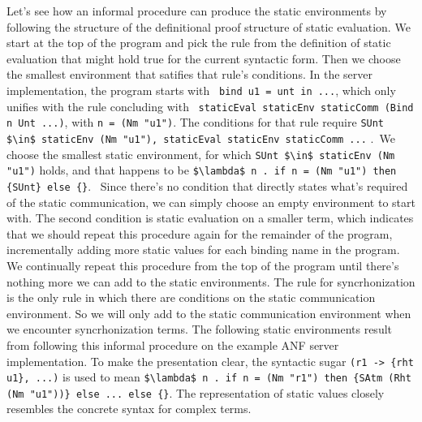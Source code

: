\documentclass[letterpaper, 11pt]{report}
\begin{document}
Let's see how an informal procedure can produce the static environments by following the
structure of the definitional proof structure of static evaluation.
We start at the top of the program and pick the 
rule from the definition of static evaluation that might hold true for the current syntactic form.
Then we choose the smallest environment that satifies that rule's conditions. 
In the server implementation, the program starts with \
\lstinline[language=normal_lang, mathescape]{bind u1 = unt in ...}, which only unifies with 
the rule concluding with \
\lstinline[language=logic, mathescape]{staticEval staticEnv staticComm (Bind n Unt ...)},
with \lstinline[language=logic, mathescape]{n = (Nm "u1")}. 
The conditions for that rule require 
\lstinline[language=logic, mathescape]{SUnt $\in$ staticEnv (Nm "u1"), staticEval staticEnv staticComm ...} .\
We choose the smallest static environment, for which
\lstinline[language=logic]{SUnt $\in$ staticEnv (Nm "u1")} holds, and that happens to be 
\lstinline[language=logic]|$\lambda$ n . if n = (Nm "u1") then {SUnt} else {}|. \
Since there's no condition that directly states what's required of the static communication, we can
simply choose an empty environment to start with. The second condition is static evaluation on
a smaller term, which indicates that we should repeat this procedure again for the remainder of
the program, incrementally adding more static values for each binding name in the program.
We continually repeat this procedure from the top of the program until there's
nothing more we can add to the static environments.
The rule for syncrhonization is the only rule in which there are conditions on
the static communication environment. So we will only add to the static communication
environment when we encounter syncrhonization terms.
The following static environments result from following this informal procedure on
the example ANF server implementation.
To make the presentation clear, the syntactic sugar \lstinline|(r1 -> {rht u1}, ...)| is used 
to mean \lstinline[language=logic]|$\lambda$ n . if n = (Nm "r1") then {SAtm (Rht (Nm "u1"))} else ... else {}|.
The representation of static values closely resembles the concrete syntax for complex terms.
\end{document}
